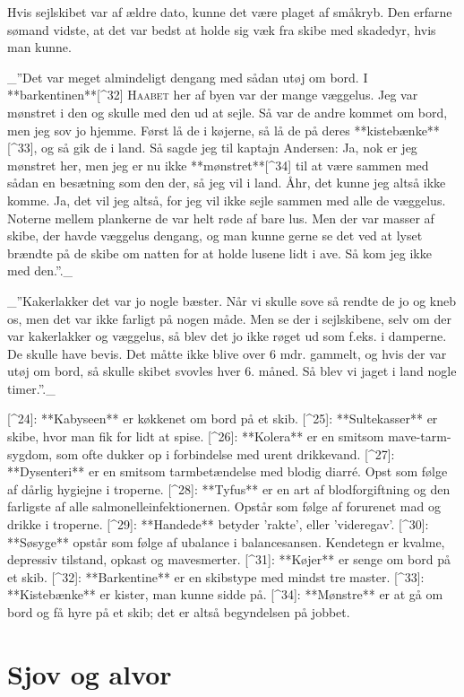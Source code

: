 \documentclass{book}
\begin{document}
Hvis sejlskibet var af ældre dato, kunne det være plaget af småkryb. Den erfarne sømand
vidste, at det var bedst at holde sig væk fra skibe med skadedyr, hvis man kunne.

_”Det var meget almindeligt dengang med sådan utøj om bord. I **barkentinen**[^32] \textsc{Haabet} her af
byen var der mange væggelus. Jeg var mønstret i den og skulle med den ud at sejle. Så var
de andre kommet om bord, men jeg sov jo hjemme. Først lå de i køjerne, så lå de på deres
**kistebænke**[^33], og så gik de i land. Så sagde jeg til kaptajn Andersen: Ja, nok er jeg
mønstret her, men jeg er nu ikke **mønstret**[^34] til at være sammen med sådan en besætning som
den der, så jeg vil i land. Åhr, det kunne jeg altså ikke komme. Ja, det vil jeg altså,
for jeg vil ikke sejle sammen med alle de væggelus. Noterne mellem plankerne de var helt
røde af bare lus. Men der var masser af skibe, der havde væggelus dengang, og man
kunne gerne se det ved at lyset brændte på de skibe om natten for at holde lusene
lidt i ave. Så kom jeg ikke med den.”._

_”Kakerlakker det var jo nogle bæster. Når vi skulle sove så rendte de jo og kneb
os, men det var ikke farligt på nogen måde. Men se der i sejlskibene, selv om der
var kakerlakker og væggelus, så blev det jo ikke røget ud som f.eks. i damperne.
De skulle have bevis. Det måtte ikke blive over 6 mdr. gammelt, og hvis der var
utøj om bord, så skulle skibet svovles hver 6. måned. Så blev vi jaget i land
nogle timer.”._

[^24]: **Kabyseen** er køkkenet om bord på et skib.
[^25]: **Sultekasser** er skibe, hvor man fik for lidt at spise.
[^26]: **Kolera** er en smitsom mave-tarm-sygdom, som ofte dukker op i
  forbindelse med urent drikkevand.
[^27]: **Dysenteri** er en smitsom tarmbetændelse med blodig diarré. Opst som
  følge af dårlig hygiejne i troperne.
[^28]: **Tyfus** er en art af blodforgiftning og den farligste af alle
  salmonelleinfektionernen. Opstår som følge af forurenet mad og drikke i
  troperne.
[^29]: **Handede** betyder 'rakte', eller 'videregav'.
[^30]: **Søsyge** opstår som følge af ubalance i balancesansen. Kendetegn er
  kvalme, depressiv tilstand, opkast og mavesmerter.
[^31]: **Køjer** er senge om bord på et skib.
[^32]: **Barkentine** er en skibstype med mindst tre master.
[^33]: **Kistebænke** er kister, man kunne sidde på.
[^34]: **Mønstre** er at gå om bord og få hyre på et skib; det er altså
  begyndelsen på jobbet.

\chapter{Sjov og alvor}
\end{document}
